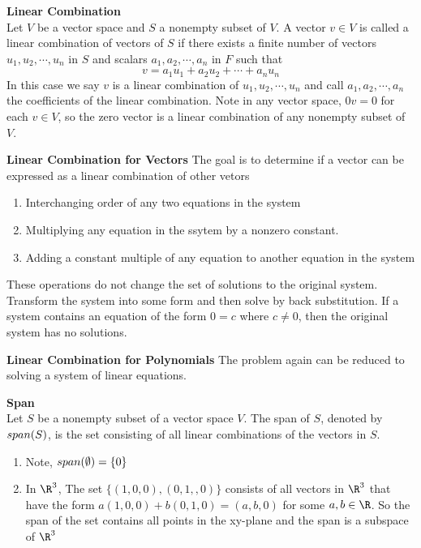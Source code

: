 \documentclass[11pt]{article}
\begin{document}


\begin{defn*}
    \textbf{Linear Combination} \\
    Let $V$ be a vector space and $S$ a nonempty subset of $V$. A vector $v\in V$ is called a linear combination of vectors of $S$ if there exists a finite number of vectors $u_1,u_2,\cdots,u_n$ in $S$ and scalars $a_1,a_2,\cdots, a_n$ in $F$ such that
    \[
        v = a_1 u_1 + a_2 u_2 + \cdots + a_n u_n    
    \]
    In this case we say $v$ is a linear combination of $u_1,u_2,\cdots, u_n$ and call $a_1, a_2, \cdots, a_n$ the coefficients of the linear combination. Note in any vector space, $0v = 0$ for each $v\in V$, so the zero vector is a linear combination of any nonempty subset of $V$. 
\end{defn*}

\begin{example}
    \textbf{Linear Combination for Vectors} The goal is to determine if a vector can be expressed as a linear combination of other vetors
    \begin{enumerate}
        \item Interchanging order of any two equations in the system 
        \item Multiplying any equation in the ssytem by a nonzero constant.
        \item Adding a constant multiple of any equation to another equation in the system 
    \end{enumerate}
    These operations do not change the set of solutions to the original system. Transform the system into some form and then solve by back substitution. If a system contains an equation of the form $0=c$ where $c\neq 0$, then the original system has no solutions. 
\end{example}


\begin{example}
    \textbf{Linear Combination for Polynomials} The problem again can be reduced to solving a system of linear equations. 
\end{example}

\begin{defn*}
    \textbf{Span} \\
    Let $S$ be a nonempty subset of a vector space $V$. The span of $S$, denoted by $span(S)$, is the set consisting of all linear combinations of the vectors in $S$. 
    \begin{enumerate}
        \item Note, $span(\emptyset) = \{ 0 \}$
        \item In $\R^3$, The set $\{(1,0,0), (0,1,,0)\}$ consists of all vectors in $\R^3$ that have the form $a(1,0,0)+b(0,1,0) = (a,b,0)$ for some $a,b\in\R$. So the span of the set contains all points in the xy-plane and the span is a subspace of $\R^3$ 
    \end{enumerate}
\end{defn*}
\end{document}
